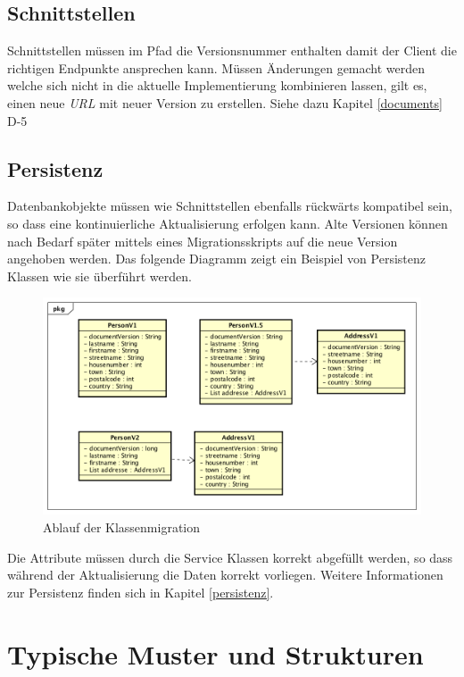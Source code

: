 \subsection{Schnittstellen}

Schnittstellen müssen im Pfad die Versionsnummer enthalten damit der Client die richtigen Endpunkte ansprechen kann. Müssen Änderungen gemacht werden welche sich nicht in die aktuelle Implementierung kombinieren lassen, gilt es, einen neue \textit{\gls{URL}} mit neuer Version zu erstellen. Siehe dazu Kapitel \ref{documents} D-5

\subsection{Persistenz}

Datenbankobjekte müssen wie Schnittstellen ebenfalls rückwärts kompatibel sein, so dass eine kontinuierliche Aktualisierung erfolgen kann. Alte Versionen können nach Bedarf später mittels eines Migrationsskripts auf die neue Version angehoben werden. Das folgende Diagramm zeigt ein Beispiel von Persistenz Klassen wie sie überführt werden. 
\begin{figure}[H]
	\centering
	\includegraphics[scale=0.6]{ClassMigration.png}
	\caption{Ablauf der Klassenmigration}
\end{figure}
Die Attribute müssen durch die Service Klassen korrekt abgefüllt werden, so dass während der Aktualisierung die Daten korrekt vorliegen. Weitere Informationen zur Persistenz finden sich in Kapitel \ref{persistenz}.

\section{Typische Muster und Strukturen}

